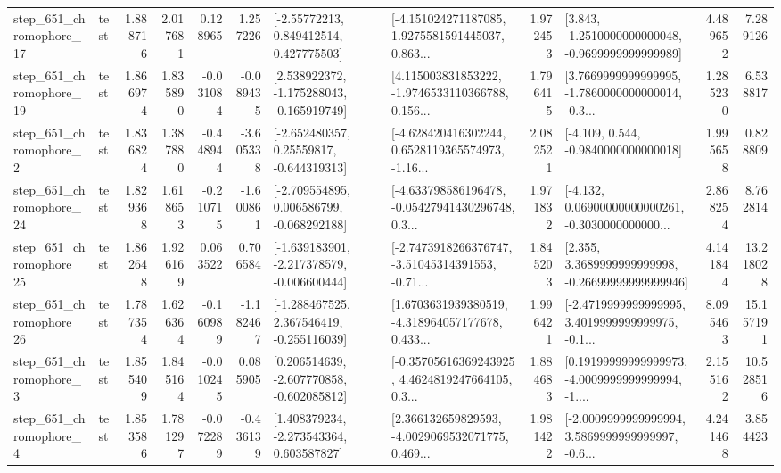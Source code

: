 \begin{tabular}{llrrrrllrlrr}
  step\_651\_chromophore\_17 &      test &      1.888716 &    2.017681 &      0.128965 &  1.257226 &     [-2.55772213, 0.849412514, 0.427775503] &  [-4.151024271187085, 1.9275581591445037, 0.863... &       1.972453 &  [3.843, -1.2510000000000048, -0.9699999999999989] &            4.489652 &          7.289126 \\
  step\_651\_chromophore\_19 &      test &      1.866974 &    1.835890 &     -0.031084 & -0.089435 &   [2.538922372, -1.175288043, -0.165919749] &  [4.115003831853222, -1.9746533110366788, 0.156... &       1.796415 &  [3.7669999999999995, -1.7860000000000014, -0.3... &            1.285230 &          6.538817 \\
   step\_651\_chromophore\_2 &      test &      1.836824 &    1.387880 &     -0.448944 & -3.605338 &    [-2.652480357, 0.25559817, -0.644319313] &  [-4.628420416302244, 0.6528119365574973, -1.16... &       2.082521 &               [-4.109, 0.544, -0.9840000000000018] &            1.995658 &          0.828809 \\
  step\_651\_chromophore\_24 &      test &      1.829368 &    1.618653 &     -0.210715 & -1.600861 &   [-2.709554895, 0.006586799, -0.068292188] &  [-4.633798586196478, -0.05427941430296748, 0.3... &       1.971832 &  [-4.132, 0.06900000000000261, -0.3030000000000... &            2.868254 &          8.762814 \\
  step\_651\_chromophore\_25 &      test &      1.862648 &    1.926169 &      0.063522 &  0.706584 &  [-1.639183901, -2.217378579, -0.006600444] &  [-2.7473918266376747, -3.51045314391553, -0.71... &       1.845203 &  [2.355, 3.3689999999999998, -0.26699999999999946] &            4.141844 &         13.218028 \\
  step\_651\_chromophore\_26 &      test &      1.787354 &    1.626364 &     -0.160989 & -1.182467 &   [-1.288467525, 2.367546419, -0.255116039] &  [1.6703631939380519, -4.318964057177678, 0.433... &       1.996421 &  [-2.4719999999999995, 3.4019999999999975, -0.1... &            8.095463 &         15.157191 \\
   step\_651\_chromophore\_3 &      test &      1.855409 &    1.845164 &     -0.010245 &  0.085905 &   [0.206514639, -2.607770858, -0.602085812] &  [-0.35705616369243925, 4.4624819247664105, 0.3... &       1.884683 &  [0.19199999999999973, -4.0009999999999994, -1.... &            2.155162 &         10.528516 \\
   step\_651\_chromophore\_4 &      test &      1.853586 &    1.781297 &     -0.072289 & -0.436139 &    [1.408379234, -2.273543364, 0.603587827] &  [2.366132659829593, -4.0029069532071775, 0.469... &       1.981422 &  [-2.0009999999999994, 3.5869999999999997, -0.6... &            4.241468 &          3.854423 \\

\end{tabular}
